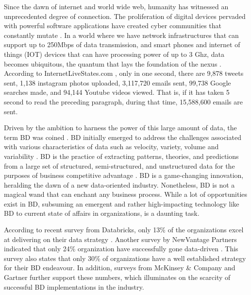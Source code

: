 \documentclass{bmcart}
\begin{document}
Since the dawn of internet and world wide web, humanity has witnessed an unprecedented degree of connection. The proliferation of digital devices pervaded with powerful software applications have created cyber communities that constantly mutate \cite{AtaeiACIS,AtaeiBigDataEnvirons}. In a world where we have network infrastructures that can support up to 250Mbps of data transmission, and smart phones and internet of things (IOT) devices that can have processing power of up to 3 Ghz, data becomes ubiquitous, the quantum that lays the foundation of the nexus \cite{AtaeiApsec}. According to InternetLiveStates.com \cite{internet2019internet}, only in one second, there are 9,878 tweets sent, 1,138 instagram photos uploaded, 3,117,720 emails sent, 99,738 Google searches made, and 94,144 Youtube videos viewed. That is, if it has taken 5 second to read the preceding paragraph, during that time, 15,588,600 emails are sent.

Driven by the ambition to harness the power of this large amount of data, the term BD was coined \cite{lycett2013datafication}. BD initially emerged to address the challenges associated with various characteristics of data such as velocity, variety, volume and variability \cite{AtaeiBigDataEnvirons}. BD is the practice of extracting patterns, theories, and predictions from a large set of structured, semi-structured, and unstructured data for the purposes of business competitive advantage \cite{AtaeiHype,Huberty}. BD is a game-changing innovation, heralding the dawn of a new data-oriented industry. Nonetheless, BD is not a magical wand that can enchant any business process. While a lot of opportunities exist in BD, subsuming an emergent and rather high-impacting technology like BD to current state of affairs in organizations, is a daunting task. 

According to recent survey from Databricks, only 13\% of the organizations excel at delivering on their data strategy \cite{DataBricksSurvey}. Another survey by NewVantage Partners indicated that only 24\% organization have successfully gone data-driven \cite{NewVantageSurvey}. This survey also states that only 30\% of organizations have a well established strategy for their BD endeavour. In addition, surveys from McKinsey \& Company \cite{analytics2016age} and Gartner \cite{Nash} further support these numbers, which illuminates on the scarcity of successful BD implementations in the industry.
\end{document}
